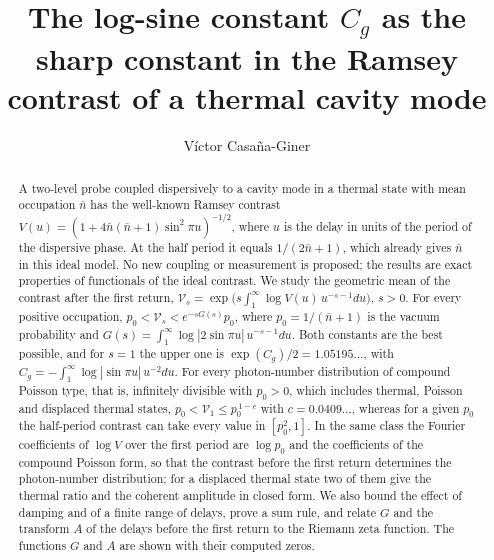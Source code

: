 \documentclass[11pt,reqno]{amsart}
\numberwithin{equation}{section}
\theoremstyle{plain}
\theoremstyle{definition}
\theoremstyle{remark}
\begin{document}
\title[The constant $C_g$ and the contrast of a thermal mode]{The log-sine constant $C_g$ as the sharp constant in the Ramsey contrast of a thermal cavity mode}
\author{V\'ictor Casa\~na-Giner}
\date{}

\begin{abstract}
A two-level probe coupled dispersively to a cavity mode in a thermal state with mean occupation $\bar n$ has the well-known Ramsey contrast $V(u)=(1+4\bar n(\bar n+1)\sin^2\pi u)^{-1/2}$, where $u$ is the delay in units of the period of the dispersive phase. At the half period it equals $1/(2\bar n+1)$, which already gives $\bar n$ in this ideal model. No new coupling or measurement is proposed; the results are exact properties of functionals of the ideal contrast. We study the geometric mean of the contrast after the first return, $\mathcal V_s=\exp\big(s\int_1^\infty\log V(u)\,u^{-s-1}du\big)$, $s>0$. For every positive occupation, $p_0<\mathcal V_s<e^{-sG(s)}p_0$, where $p_0=1/(\bar n+1)$ is the vacuum probability and $G(s)=\int_1^\infty\log|2\sin\pi u|\,u^{-s-1}du$. Both constants are the best possible, and for $s=1$ the upper one is $\exp(C_g)/2=1.05195\ldots$, with $C_g=-\int_1^\infty\log|\sin\pi u|\,u^{-2}du$. For every photon-number distribution of compound Poisson type, that is, infinitely divisible with $p_0>0$, which includes thermal, Poisson and displaced thermal states, $p_0<\mathcal V_1\le p_0^{\,1-c}$ with $c=0.0409\ldots$, whereas for a given $p_0$ the half-period contrast can take every value in $[p_0^2,1]$. In the same class the Fourier coefficients of $\log V$ over the first period are $\log p_0$ and the coefficients of the compound Poisson form, so that the contrast before the first return determines the photon-number distribution; for a displaced thermal state two of them give the thermal ratio and the coherent amplitude in closed form. We also bound the effect of damping and of a finite range of delays, prove a sum rule, and relate $G$ and the transform $A$ of the delays before the first return to the Riemann zeta function. The functions $G$ and $A$ are shown with their computed zeros.
\end{abstract}


\maketitle
\tableofcontents
\end{document}
